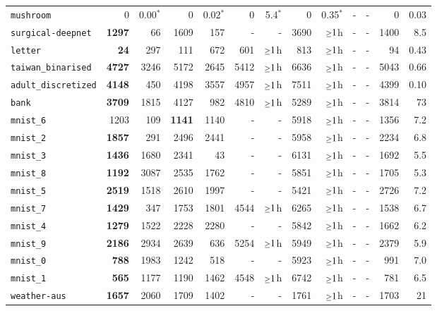 \begin{tabular}{lrrrrrrrrrrrr}
\texttt{mushroom} & 0 & 0.00$^*$ & 0 & 0.02$^*$ & 0 & 5.4$^*$ & 0 & 0.35$^*$ & - & - & 0 & 0.03\\
\texttt{surgical-deepnet} & \textbf{1297} & 66 & 1609 & 157 & - & - & 3690 & $\mathsmaller{\geq}1$h & - & - & 1400 & 8.5\\
\texttt{letter} & \textbf{24} & 297 & 111 & 672 & 601 & $\mathsmaller{\geq}1$h & 813 & $\mathsmaller{\geq}1$h & - & - & 94 & 0.43\\
\texttt{taiwan\_binarised} & \textbf{4727} & 3246 & 5172 & 2645 & 5412 & $\mathsmaller{\geq}1$h & 6636 & $\mathsmaller{\geq}1$h & - & - & 5043 & 0.66\\
\texttt{adult\_discretized} & \textbf{4148} & 450 & 4198 & 3557 & 4957 & $\mathsmaller{\geq}1$h & 7511 & $\mathsmaller{\geq}1$h & - & - & 4399 & 0.10\\
\texttt{bank} & \textbf{3709} & 1815 & 4127 & 982 & 4810 & $\mathsmaller{\geq}1$h & 5289 & $\mathsmaller{\geq}1$h & - & - & 3814 & 73\\
\texttt{mnist\_6} & 1203 & 109 & \textbf{1141} & 1140 & - & - & 5918 & $\mathsmaller{\geq}1$h & - & - & 1356 & 7.2\\
\texttt{mnist\_2} & \textbf{1857} & 291 & 2496 & 2441 & - & - & 5958 & $\mathsmaller{\geq}1$h & - & - & 2234 & 6.8\\
\texttt{mnist\_3} & \textbf{1436} & 1680 & 2341 & 43 & - & - & 6131 & $\mathsmaller{\geq}1$h & - & - & 1692 & 5.5\\
\texttt{mnist\_8} & \textbf{1192} & 3087 & 2535 & 1762 & - & - & 5851 & $\mathsmaller{\geq}1$h & - & - & 1705 & 5.3\\
\texttt{mnist\_5} & \textbf{2519} & 1518 & 2610 & 1997 & - & - & 5421 & $\mathsmaller{\geq}1$h & - & - & 2726 & 7.2\\
\texttt{mnist\_7} & \textbf{1429} & 347 & 1753 & 1801 & 4544 & $\mathsmaller{\geq}1$h & 6265 & $\mathsmaller{\geq}1$h & - & - & 1538 & 6.7\\
\texttt{mnist\_4} & \textbf{1279} & 1522 & 2228 & 2280 & - & - & 5842 & $\mathsmaller{\geq}1$h & - & - & 1662 & 6.2\\
\texttt{mnist\_9} & \textbf{2186} & 2934 & 2639 & 636 & 5254 & $\mathsmaller{\geq}1$h & 5949 & $\mathsmaller{\geq}1$h & - & - & 2379 & 5.9\\
\texttt{mnist\_0} & \textbf{788} & 1983 & 1242 & 518 & - & - & 5923 & $\mathsmaller{\geq}1$h & - & - & 991 & 7.0\\
\texttt{mnist\_1} & \textbf{565} & 1177 & 1190 & 1462 & 4548 & $\mathsmaller{\geq}1$h & 6742 & $\mathsmaller{\geq}1$h & - & - & 781 & 6.5\\
\texttt{weather-aus} & \textbf{1657} & 2060 & 1709 & 1402 & - & - & 1761 & $\mathsmaller{\geq}1$h & - & - & 1703 & 21\\
\bottomrule
\end{tabular}
